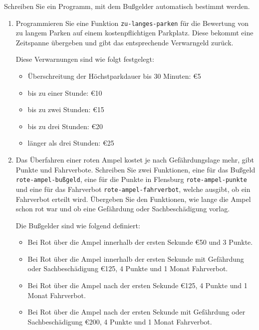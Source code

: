 \begin{aufgabe}
  Schreiben Sie ein Programm, mit dem Bußgelder
  automatisch bestimmt werden.
  
  \begin{enumerate}
  \item Programmieren Sie eine Funktion \texttt{zu-langes-parken}
    für die Bewertung von zu langem Parken auf einem kostenpflichtigen
    Parkplatz. Diese bekommt eine Zeitspanne übergeben und gibt das 
    entsprechende Verwarngeld zurück.
    
    Diese Verwarnungen sind wie folgt festgelegt:
    \begin{itemize}
    \item Überschreitung der Höchstparkdauer bis 30 Minuten: \euro{5}
    \item bis zu einer Stunde: \euro{10}
    \item bis zu zwei Stunden: \euro{15}
    \item bis zu drei Stunden: \euro{20}
    \item länger als drei Stunden:  \euro{25}
    \end{itemize}
    
  \item Das Überfahren einer roten Ampel kostet je nach
    Gefährdungslage mehr, gibt Punkte und Fahrverbote. Schreiben Sie
    zwei Funktionen, eine für das Bußgeld \texttt{rote-ampel-bußgeld}, 
    eine für die Punkte in Flensburg \texttt{rote-ampel-punkte} 
    und eine für das Fahrverbot \texttt{rote-ampel-fahrverbot}, 
    welche ausgibt, ob ein Fahrverbot erteilt wird. Übergeben
    Sie den Funktionen, wie lange die Ampel schon rot war und ob eine
    Gefährdung oder Sachbeschädigung vorlag.
    
    Die Bußgelder sind wie folgend definiert:
    \begin{itemize}
    \item Bei Rot über die Ampel innerhalb der ersten Sekunde			
      \euro{50} und 3 Punkte.
    \item Bei Rot über die Ampel innerhalb der ersten Sekunde mit
      Gefährdung oder Sachbeschädigung \euro{125}, 4 		
      Punkte und 1 Monat Fahrverbot.
    \item Bei Rot über die Ampel nach der ersten Sekunde \euro{125},
      4 Punkte und 1 Monat Fahrverbot.
    \item Bei Rot über die Ampel nach der ersten Sekunde mit
      Gefährdung oder Sachbeschädigung \euro{200}, 4
      Punkte und 1 Monat Fahrverbot.
    \end{itemize}
    
    
  \end{enumerate}
\end{aufgabe}


